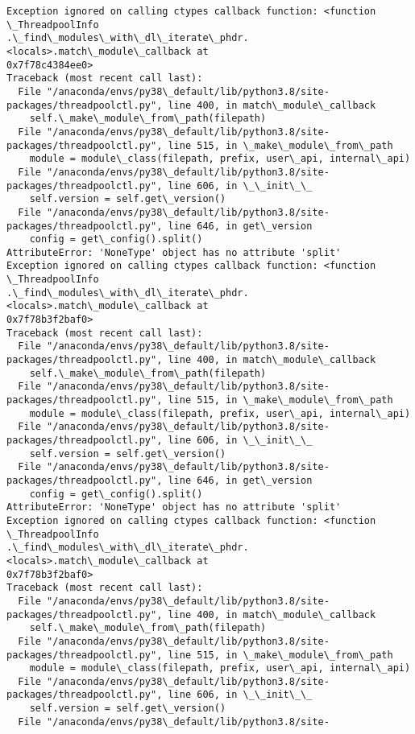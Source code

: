 \documentclass[11pt]{article}
\begin{document}
\begin{Verbatim}[commandchars=\\\{\}]
Exception ignored on calling ctypes callback function: <function \_ThreadpoolInfo
.\_find\_modules\_with\_dl\_iterate\_phdr.<locals>.match\_module\_callback at
0x7f78c4384ee0>
Traceback (most recent call last):
  File "/anaconda/envs/py38\_default/lib/python3.8/site-
packages/threadpoolctl.py", line 400, in match\_module\_callback
    self.\_make\_module\_from\_path(filepath)
  File "/anaconda/envs/py38\_default/lib/python3.8/site-
packages/threadpoolctl.py", line 515, in \_make\_module\_from\_path
    module = module\_class(filepath, prefix, user\_api, internal\_api)
  File "/anaconda/envs/py38\_default/lib/python3.8/site-
packages/threadpoolctl.py", line 606, in \_\_init\_\_
    self.version = self.get\_version()
  File "/anaconda/envs/py38\_default/lib/python3.8/site-
packages/threadpoolctl.py", line 646, in get\_version
    config = get\_config().split()
AttributeError: 'NoneType' object has no attribute 'split'
Exception ignored on calling ctypes callback function: <function \_ThreadpoolInfo
.\_find\_modules\_with\_dl\_iterate\_phdr.<locals>.match\_module\_callback at
0x7f78b3f2baf0>
Traceback (most recent call last):
  File "/anaconda/envs/py38\_default/lib/python3.8/site-
packages/threadpoolctl.py", line 400, in match\_module\_callback
    self.\_make\_module\_from\_path(filepath)
  File "/anaconda/envs/py38\_default/lib/python3.8/site-
packages/threadpoolctl.py", line 515, in \_make\_module\_from\_path
    module = module\_class(filepath, prefix, user\_api, internal\_api)
  File "/anaconda/envs/py38\_default/lib/python3.8/site-
packages/threadpoolctl.py", line 606, in \_\_init\_\_
    self.version = self.get\_version()
  File "/anaconda/envs/py38\_default/lib/python3.8/site-
packages/threadpoolctl.py", line 646, in get\_version
    config = get\_config().split()
AttributeError: 'NoneType' object has no attribute 'split'
Exception ignored on calling ctypes callback function: <function \_ThreadpoolInfo
.\_find\_modules\_with\_dl\_iterate\_phdr.<locals>.match\_module\_callback at
0x7f78b3f2baf0>
Traceback (most recent call last):
  File "/anaconda/envs/py38\_default/lib/python3.8/site-
packages/threadpoolctl.py", line 400, in match\_module\_callback
    self.\_make\_module\_from\_path(filepath)
  File "/anaconda/envs/py38\_default/lib/python3.8/site-
packages/threadpoolctl.py", line 515, in \_make\_module\_from\_path
    module = module\_class(filepath, prefix, user\_api, internal\_api)
  File "/anaconda/envs/py38\_default/lib/python3.8/site-
packages/threadpoolctl.py", line 606, in \_\_init\_\_
    self.version = self.get\_version()
  File "/anaconda/envs/py38\_default/lib/python3.8/site-

\end{Verbatim}
\end{document}
